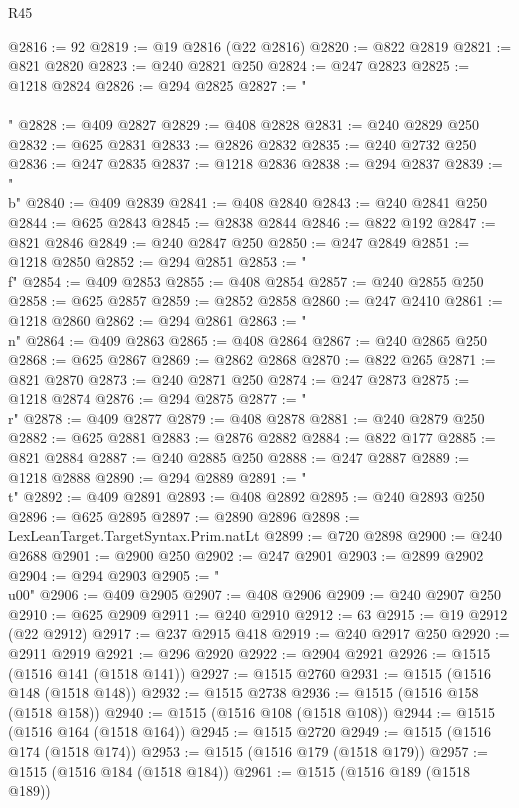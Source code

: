 \begin{lexlean}{R45}
\begin{coremodule}
{@2816 := 92
@2819 := @19 @2816 (@22 @2816)
@2820 := @822 @2819
@2821 := @821 @2820
@2823 := @240 @2821 @250
@2824 := @247 @2823
@2825 := @1218 @2824
@2826 := @294 @2825
@2827 := "\\\\"
@2828 := @409 @2827
@2829 := @408 @2828
@2831 := @240 @2829 @250
@2832 := @625 @2831
@2833 := @2826 @2832
@2835 := @240 @2732 @250
@2836 := @247 @2835
@2837 := @1218 @2836
@2838 := @294 @2837
@2839 := "\\b"
@2840 := @409 @2839
@2841 := @408 @2840
@2843 := @240 @2841 @250
@2844 := @625 @2843
@2845 := @2838 @2844
@2846 := @822 @192
@2847 := @821 @2846
@2849 := @240 @2847 @250
@2850 := @247 @2849
@2851 := @1218 @2850
@2852 := @294 @2851
@2853 := "\\f"
@2854 := @409 @2853
@2855 := @408 @2854
@2857 := @240 @2855 @250
@2858 := @625 @2857
@2859 := @2852 @2858
@2860 := @247 @2410
@2861 := @1218 @2860
@2862 := @294 @2861
@2863 := "\\n"
@2864 := @409 @2863
@2865 := @408 @2864
@2867 := @240 @2865 @250
@2868 := @625 @2867
@2869 := @2862 @2868
@2870 := @822 @265
@2871 := @821 @2870
@2873 := @240 @2871 @250
@2874 := @247 @2873
@2875 := @1218 @2874
@2876 := @294 @2875
@2877 := "\\r"
@2878 := @409 @2877
@2879 := @408 @2878
@2881 := @240 @2879 @250
@2882 := @625 @2881
@2883 := @2876 @2882
@2884 := @822 @177
@2885 := @821 @2884
@2887 := @240 @2885 @250
@2888 := @247 @2887
@2889 := @1218 @2888
@2890 := @294 @2889
@2891 := "\\t"
@2892 := @409 @2891
@2893 := @408 @2892
@2895 := @240 @2893 @250
@2896 := @625 @2895
@2897 := @2890 @2896
@2898 := LexLeanTarget.TargetSyntax.Prim.natLt
@2899 := @720 @2898
@2900 := @240 @2688
@2901 := @2900 @250
@2902 := @247 @2901
@2903 := @2899 @2902
@2904 := @294 @2903
@2905 := "\\u00"
@2906 := @409 @2905
@2907 := @408 @2906
@2909 := @240 @2907 @250
@2910 := @625 @2909
@2911 := @240 @2910
@2912 := 63
@2915 := @19 @2912 (@22 @2912)
@2917 := @237 @2915 @418
@2919 := @240 @2917 @250
@2920 := @2911 @2919
@2921 := @296 @2920
@2922 := @2904 @2921
@2926 := @1515 (@1516 @141 (@1518 @141))
@2927 := @1515 @2760
@2931 := @1515 (@1516 @148 (@1518 @148))
@2932 := @1515 @2738
@2936 := @1515 (@1516 @158 (@1518 @158))
@2940 := @1515 (@1516 @108 (@1518 @108))
@2944 := @1515 (@1516 @164 (@1518 @164))
@2945 := @1515 @2720
@2949 := @1515 (@1516 @174 (@1518 @174))
@2953 := @1515 (@1516 @179 (@1518 @179))
@2957 := @1515 (@1516 @184 (@1518 @184))
@2961 := @1515 (@1516 @189 (@1518 @189))
}
\end{coremodule}
\end{lexlean}
